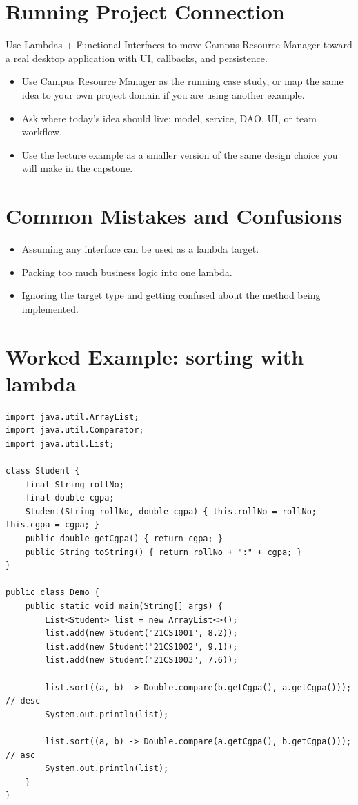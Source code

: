 \documentclass[11pt]{article}
\begin{document}
\section{Running Project Connection}
Use Lambdas + Functional Interfaces to move Campus Resource Manager toward a real desktop application with UI, callbacks, and persistence.
\begin{itemize}
  \item Use Campus Resource Manager as the running case study, or map the same idea to your own project domain if you are using another example.
  \item Ask where today's idea should live: model, service, DAO, UI, or team workflow.
  \item Use the lecture example as a smaller version of the same design choice you will make in the capstone.
\end{itemize}
\notesources{\OOPSUnitIVSources}

\section{Common Mistakes and Confusions}
\begin{itemize}
  \item Assuming any interface can be used as a lambda target.
  \item Packing too much business logic into one lambda.
  \item Ignoring the target type and getting confused about the method being implemented.
\end{itemize}
\notesources{\OOPSUnitIVSources}

\section{Worked Example: sorting with lambda}
\begin{lstlisting}
import java.util.ArrayList;
import java.util.Comparator;
import java.util.List;

class Student {
    final String rollNo;
    final double cgpa;
    Student(String rollNo, double cgpa) { this.rollNo = rollNo; this.cgpa = cgpa; }
    public double getCgpa() { return cgpa; }
    public String toString() { return rollNo + ":" + cgpa; }
}

public class Demo {
    public static void main(String[] args) {
        List<Student> list = new ArrayList<>();
        list.add(new Student("21CS1001", 8.2));
        list.add(new Student("21CS1002", 9.1));
        list.add(new Student("21CS1003", 7.6));

        list.sort((a, b) -> Double.compare(b.getCgpa(), a.getCgpa())); // desc
        System.out.println(list);

        list.sort((a, b) -> Double.compare(a.getCgpa(), b.getCgpa())); // asc
        System.out.println(list);
    }
}
\end{lstlisting}
\end{document}
